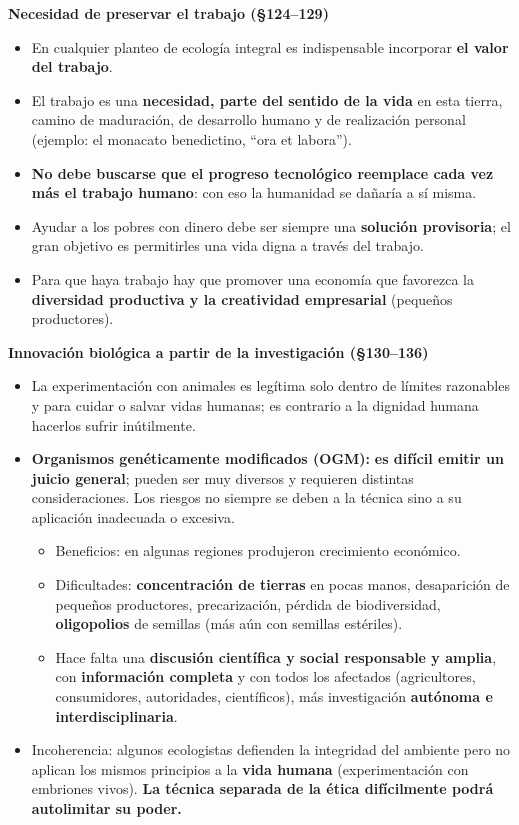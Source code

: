 \documentclass[10pt,a4paper]{article}
\begin{document}
\medskip\noindent \textbf{Necesidad de preservar el trabajo (\S{}124--129)}\par\nopagebreak
\begin{itemize}
\item En cualquier planteo de ecología integral es indispensable incorporar \textbf{el valor del trabajo}.
\item El trabajo es una \textbf{necesidad, parte del sentido de la vida} en esta tierra, camino de maduración, de desarrollo humano y de realización personal (ejemplo: el monacato benedictino, ``ora et labora'').
\item \textbf{No debe buscarse que el progreso tecnológico reemplace cada vez más el trabajo humano}: con eso la humanidad se dañaría a sí misma.
\item Ayudar a los pobres con dinero debe ser siempre una \textbf{solución provisoria}; el gran objetivo es permitirles una vida digna a través del trabajo.
\item Para que haya trabajo hay que promover una economía que favorezca la \textbf{diversidad productiva y la creatividad empresarial} (pequeños productores).
\end{itemize}

\medskip\noindent \textbf{Innovación biológica a partir de la investigación (\S{}130--136)}\par\nopagebreak
\begin{itemize}
\item La experimentación con animales es legítima solo dentro de límites razonables y para cuidar o salvar vidas humanas; es contrario a la dignidad humana hacerlos sufrir inútilmente.
\item \textbf{Organismos genéticamente modificados (OGM):} \textbf{es difícil emitir un juicio general}; pueden ser muy diversos y requieren distintas consideraciones. Los riesgos no siempre se deben a la técnica sino a su aplicación inadecuada o excesiva.
\begin{itemize}
\item Beneficios: en algunas regiones produjeron crecimiento económico.
\item Dificultades: \textbf{concentración de tierras} en pocas manos, desaparición de pequeños productores, precarización, pérdida de biodiversidad, \textbf{oligopolios} de semillas (más aún con semillas estériles).
\item Hace falta una \textbf{discusión científica y social responsable y amplia}, con \textbf{información completa} y con todos los afectados (agricultores, consumidores, autoridades, científicos), más investigación \textbf{autónoma e interdisciplinaria}.
\end{itemize}
\item Incoherencia: algunos ecologistas defienden la integridad del ambiente pero no aplican los mismos principios a la \textbf{vida humana} (experimentación con embriones vivos). \textbf{La técnica separada de la ética difícilmente podrá autolimitar su poder.}
\end{itemize}
\end{document}
